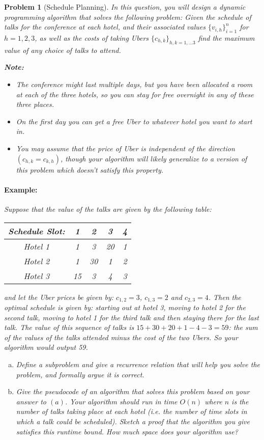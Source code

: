 \documentclass[10pt]{article}
\newtheorem{problem}{\sc\color{cit}Problem}
\begin{document}
\begin{problem}[Schedule Planning]

\noindent
In this question, you will design a dynamic programming algorithm that solves the following problem: Given the schedule of talks for the conference at each hotel, and their associated values $\{v_{i,h}\}_{i=1}^n$ for $h=1,2,3$, as well as the costs of taking Ubers $\{c_{h,k}\}_{h,k =1,...3}$ find the maximum value of any choice of talks to attend.

\noindent \textbf{Note:} 
\begin{itemize}
    \item The conference might last multiple days, but you have been allocated a room at each of the three hotels, so you can stay for free overnight in any of these three places.
    \item On the first day you can get a free Uber to whatever hotel you want to start in.
    \item You may assume that the price of Uber is independent of the direction $(c_{h,k} = c_{k,h})$, though your algorithm will likely generalize to a version of this problem which doesn't satisfy this property.
\end{itemize} 

\paragraph{Example:} Suppose that the value of the talks are given by the following table:
\begin{center}
\begin{tabular}{| c | c c c c |}\hline
    Schedule Slot: & 1 & 2 & 3 & 4  \\\hline
    Hotel 1 &  1 & 3 & 20 & 1\\
    Hotel 2 &  1 & 30 & 1 & 2\\
    Hotel 3 &  15 & 3 & 4 & 3 \\\hline
\end{tabular}
\end{center}
and let the Uber prices be given by: $c_{1,2} = 3$, $c_{1,3} = 2$ and $c_{2,3} = 4$. Then the optimal schedule is given by: starting out at hotel 3, moving to hotel 2 for the second talk, moving to hotel 1 for the third talk and then staying there for the last talk. The value of this sequence of talks is $15+30+20+1-4-3=59$: the sum of the values of the talks attended minus the cost of the two Ubers. So your algorithm would output 59.

\begin{enumerate}[(a)]
    \item Define a subproblem and give a recurrence relation that will help you solve the problem, and formally argue it is correct.
    \item Give the pseudocode of an algorithm that solves this problem based on your answer to $(a)$. Your algorithm should run in time $O(n)$ where $n$ is the number of talks taking place at each hotel (i.e. the number of time slots in which a talk could be scheduled). Sketch a proof that the algorithm you give satisfies this runtime bound. How much space does your algorithm use?
\end{enumerate}

\end{problem}
\end{document}
